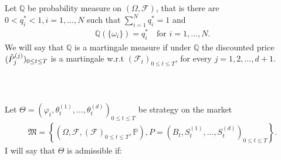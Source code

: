 \documentclass{beamer}
\numberwithin{equation}{section}
\begin{document}
\begin{frame}\frametitle{{\normalsize \secname} \\ {\large \subsecname}}
    \begin{definition}
        Let $\mathbb{Q}$ be probability measure on $(\Omega, \mathscr{F})$, that is there are $0 < q^*_i < 1, i = 1, \ldots, N$ such that $\sum_{i=1}^N q^*_i = 1$ and
        \begin{align}
            \mathbb{Q}(\{ \omega_i \}) = q^*_i \quad \text{for } i = 1, \ldots, N.
        \end{align}
        We will say that $\mathbb{Q}$ is a martingale measure if under $\mathbb{Q}$ the discounted price $(\Tilde{P}_j^{(j)})_{0 \leq t \leq T}$ is a martingale w.r.t $(\mathscr{F}_t)_{0 \leq t \leq T}$, for every $j = 1,2, \ldots, d+1$.
    \end{definition}
\end{frame}

\begin{frame}\frametitle{{\normalsize \secname} \\ {\large \subsecname}}
    \begin{definition}
        Let $\Theta = \left(\varphi_t, \theta_t^{(1)}, \ldots, \theta_t^{(d)}\right)_{0 \leq t \leq T}$ be strategy on the market
        \begin{align}
            \mathfrak{M} =
            \left\{
                \left(
                    \Omega,
                    \mathscr{F},
                    \left(
                        \mathscr{F}
                    \right)_{0 \leq t \leq T},
                    \mathbb{P}
                \right),
                P =
                \left(
                    B_t,
                    S_t^{(1)},
                    \ldots,
                    S_t^{(d)}
                \right)_{0 \leq t \leq T}
            \right\}.
        \end{align}
        I will say that $\Theta$ is admissible if:
    \end{definition}
\end{frame}
\end{document}
